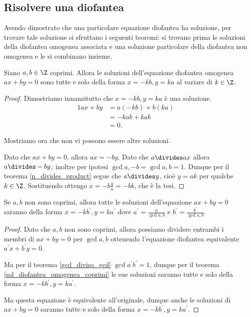 \subsection*{Risolvere una diofantea}

Avendo dimostrato che una particolare equazione diofantea ha soluzione, per trovare tale soluzione si sfruttano i seguenti teoremi: si trovano prima le soluzioni della diofantea omogenea associata e una soluzione particolare della diofantea non omogenea e le si combinano insieme.

\begin{theorem} \label{sol_diofantea_omogenea_coprimi}
    Siano $a, b \in \Z$ coprimi. Allora le soluzioni dell'equazione diofantea omogenea $ax + by = 0$ sono tutte e solo della forma $x = -kb, y = ka$ al variare di $k \in \Z$.
\end{theorem}
\begin{proof}
    Dimostriamo innanzitutto che $x = -kb, y = ka$ è una soluzione.
    \begin{alignat*}{1}
        ax + by &= a(-kb) + b(ka)\\
                &= -kab + kab\\
                &= 0.
    \end{alignat*}

    Mostriamo ora che non vi possono essere altre soluzioni. 
    
    Dato che $ax + by = 0$, allora $ax = -by$.
    Dato che $a \divides ax$ allora $a \divides -by$; inoltre per ipotesi $\gcd{a, -b} = \gcd{a, b} = 1$.
    Dunque per il teorema \ref{n_divides_product} segue che $a \divides y$, cioè $y = ak$ per qualche $k \in \Z$. Sostituendo ottengo $x = -b\frac{y}{a} = -bk$, che è la tesi.
\end{proof}

\begin{corollary} \label{sol_diofantea_omogenea}
    Se $a, b$ non sono coprimi, allora tutte le soluzioni dell'equazione $ax + by = 0$ saranno della forma $x = -kb^\prime, y = ka^\prime$ dove $a^\prime = \frac{a}{\gcd{a, b}}$ e $b^\prime = \frac{b^\prime}{\gcd{a, b}}.$
\end{corollary}
\begin{proof}
    Dato che $a, b$ non sono coprimi, allora possiamo dividere entrambi i membri di $ax + by = 0$ per $\gcd{a, b}$ ottenendo l'equazione diofantea equivalente $a^\prime x + b^\prime y = 0$. 
    
    Ma per il teorema \ref{gcd_diviso_gcd} $\gcd{a^\prime}{b^\prime} = 1$, dunque per il teorema \ref{sol_diofantea_omogenea_coprimi} le sue soluzioni saranno tutte e solo della forma $x = -kb^\prime, y = ka^\prime$. 
    
    Ma questa equazione è equivalente all'originale, dunque anche le soluzioni di $ax + by = 0$ saranno tutte e solo della forma $x = -kb^\prime, y = ka^\prime$.
\end{proof}

